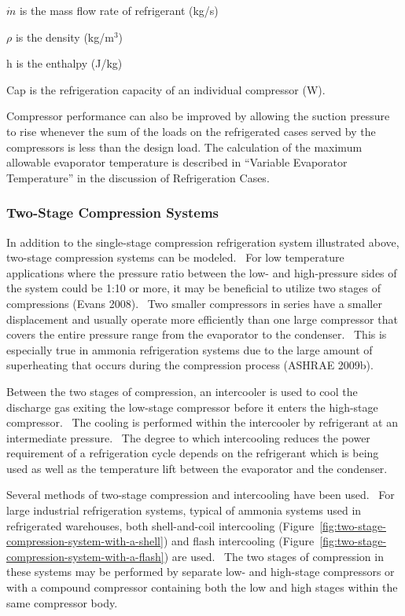 \(\dot m\) is the mass flow rate of refrigerant (kg/s)

\(\rho\) is the density (kg/m\(^{3}\))

h is the enthalpy (J/kg)

Cap is the refrigeration capacity of an individual compressor (W).

Compressor performance can also be improved by allowing the suction pressure to rise whenever the sum of the loads on the refrigerated cases served by the compressors is less than the design load. The calculation of the maximum allowable evaporator temperature is described in ``Variable Evaporator Temperature'' in the discussion of Refrigeration Cases.

\subsubsection{Two-Stage Compression Systems}\label{two-stage-compression-systems}

In addition to the single-stage compression refrigeration system illustrated above, two-stage compression systems can be modeled.~ For low temperature applications where the pressure ratio between the low- and high-pressure sides of the system could be 1:10 or more, it may be beneficial to utilize two stages of compressions (Evans 2008).~ Two smaller compressors in series have a smaller displacement and usually operate more efficiently than one large compressor that covers the entire pressure range from the evaporator to the condenser.~ This is especially true in ammonia refrigeration systems due to the large amount of superheating that occurs during the compression process (ASHRAE 2009b).

Between the two stages of compression, an intercooler is used to cool the discharge gas exiting the low-stage compressor before it enters the high-stage compressor.~ The cooling is performed within the intercooler by refrigerant at an intermediate pressure.~ The degree to which intercooling reduces the power requirement of a refrigeration cycle depends on the refrigerant which is being used as well as the temperature lift between the evaporator and the condenser.

Several methods of two-stage compression and intercooling have been used.~ For large industrial refrigeration systems, typical of ammonia systems used in refrigerated warehouses, both shell-and-coil intercooling (Figure~\ref{fig:two-stage-compression-system-with-a-shell}) and flash intercooling (Figure~\ref{fig:two-stage-compression-system-with-a-flash}) are used.~ The two stages of compression in these systems may be performed by separate low- and high-stage compressors or with a compound compressor containing both the low and high stages within the same compressor body.

